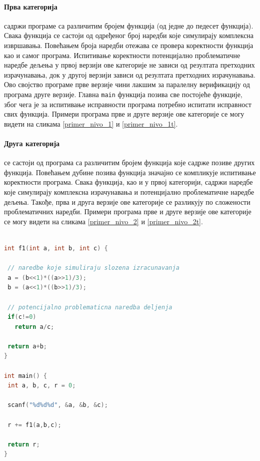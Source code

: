 \documentclass[12pt,oneside]{memoir}
\begin{document}
\paragraph{Прва категорија} садржи програме са различитим бројем функција (од једне до педесет функција). Свака функција се састоји од одређеног број наредби које симулирају комплексна извршавања. Повећањем броја наредби отежава се провера коректности функција као и самог програма. Испитивање коректности потенцијално проблематичне наредбе дељења у првој верзији ове категорије не зависи од резултата претходних израчунавања, док у другој верзији зависи од резултата претходних израчунавања. Ово својство програме прве верзије чини лакшим за паралелну верификацију од програма друге верзије. Главна \texttt{main} функција позива све постојеће функције, због чега је за испитивање исправности програма потребно испитати исправност свих функција. Примери програма прве и друге верзије ове категорије се могу видети на сликама \ref{primer_nivo_1} и \ref{primer_nivo_1t}.

\paragraph{Друга категорија} се састоји од програма са различитим бројем функција које садрже позиве других функција. Повећањем дубине позива функција значајно се компликује испитивање коректности програма. Свака функција, као и у првој категорији, садржи наредбе које симулирају комплексна израчунавања и потенцијално проблематичне наредбе дељења. Такође, прва и друга верзије ове категорије се разликују по сложености проблематичних наредби. Примери програма прве и друге верзије ове категорије се могу видети на сликама \ref{primer_nivo_2} и \ref{primer_nivo_2t}.
 
\begin{lstlisting}[language=C,frame=single,caption=Пример програма прве категорије (прва верзија),label=primer_nivo_1]

int f1(int a, int b, int c) {

 // naredbe koje simuliraju slozena izracunavanja
 a = (b<<1)*((a>>1)/3);
 b = (a<<1)*((b>>1)/3);
  
 // potencijalno problematicna naredba deljenja
 if(c!=0)
   return a/c;
   
 return a+b;
}

int main() {
 int a, b, c, r = 0;
 
 scanf("%d%d%d", &a, &b, &c);
 
 r += f1(a,b,c);
 
 return r;
}

\end{lstlisting}
\end{document}
